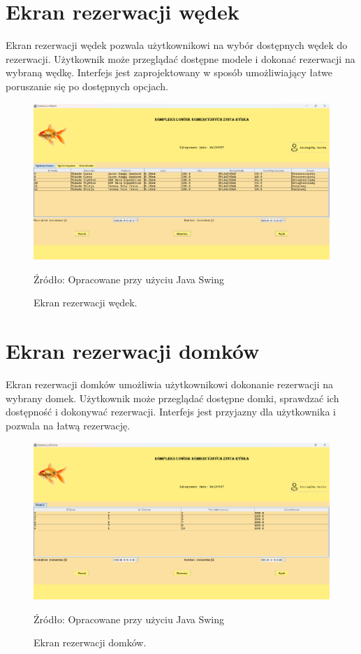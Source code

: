 \section{Ekran rezerwacji wędek}
Ekran rezerwacji wędek pozwala użytkownikowi na wybór dostępnych wędek do rezerwacji. Użytkownik może przeglądać dostępne modele i dokonać rezerwacji na wybraną wędkę. Interfejs jest zaprojektowany w sposób umożliwiający łatwe poruszanie się po dostępnych opcjach.
\begin{figure}[H]
    \centering
    \includegraphics[width=0.8\linewidth]{figures/rods.eps}
    \caption{Ekran rezerwacji wędek.}
    \label{fig:rods_screen}
    \small{Źródło: Opracowane przy użyciu Java Swing}
\end{figure}


\section{Ekran rezerwacji domków}
Ekran rezerwacji domków umożliwia użytkownikowi dokonanie rezerwacji na wybrany domek. Użytkownik może przeglądać dostępne domki, sprawdzać ich dostępność i dokonywać rezerwacji. Interfejs jest przyjazny dla użytkownika i pozwala na łatwą rezerwację.
\begin{figure}[H]
    \centering
    \includegraphics[width=0.8\linewidth]{figures/houses.eps}
    \caption{Ekran rezerwacji domków.}
    \label{fig:houses_screen}
    \small{Źródło: Opracowane przy użyciu Java Swing}
\end{figure}


